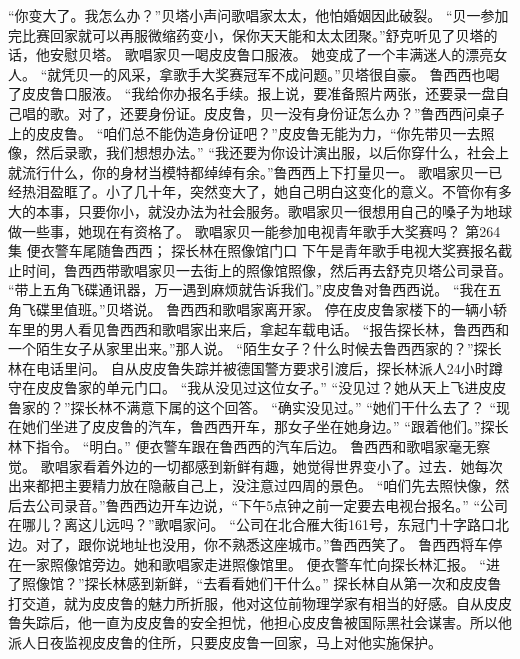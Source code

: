 \documentclass[a4paper,12pt,UTF8,twoside]{ctexbook}
\begin{document}
        “你变大了。我怎么办？”贝塔小声问歌唱家太太，他怕婚姻因此破裂。  
        “贝一参加完比赛回家就可以再服微缩药变小，保你天天能和太太团聚。”舒克听见了贝塔的话，他安慰贝塔。  
        歌唱家贝一喝皮皮鲁口服液。  
        她变成了一个丰满迷人的漂亮女人。  
        “就凭贝一的风采，拿歌手大奖赛冠军不成问题。”贝塔很自豪。  
        鲁西西也喝了皮皮鲁口服液。  
        “我给你办报名手续。报上说，要准备照片两张，还要录一盘自己唱的歌。对了，还要身份证。皮皮鲁，贝一没有身份证怎么办？”鲁西西问桌子上的皮皮鲁。  
        “咱们总不能伪造身份证吧？”皮皮鲁无能为力，“你先带贝一去照像，然后录歌，我们想想办法。”  
        “我还要为你设计演出服，以后你穿什么，社会上就流行什么，你的身材当模特都绰绰有余。”鲁西西上下打量贝一。  
        歌唱家贝一已经热泪盈眶了。小了几十年，突然变大了，她自己明白这变化的意义。不管你有多大的本事，只要你小，就没办法为社会服务。歌唱家贝一很想用自己的嗓子为地球做一些事，她现在有资格了。  
        歌唱家贝一能参加电视青年歌手大奖赛吗？        第264集  
        便衣警车尾随鲁西西；  
        探长林在照像馆门口  
        下午是青年歌手电视大奖赛报名截止时间，鲁西西带歌唱家贝一去街上的照像馆照像，然后再去舒克贝塔公司录音。  
        “带上五角飞碟通讯器，万一遇到麻烦就告诉我们。”皮皮鲁对鲁西西说。  
        “我在五角飞碟里值班。”贝塔说。  
        鲁西西和歌唱家离开家。  
        停在皮皮鲁家楼下的一辆小轿车里的男人看见鲁西西和歌唱家出来后，拿起车载电话。  
        “报告探长林，鲁西西和一个陌生女子从家里出来。”那人说。  
        “陌生女子？什么时候去鲁西西家的？”探长林在电话里问。        
        自从皮皮鲁失踪并被德国警方要求引渡后，探长林派人24小时蹲守在皮皮鲁家的单元门口。  
        “我从没见过这位女子。”  
        “没见过？她从天上飞进皮皮鲁家的？”探长林不满意下属的这个回答。  
        “确实没见过。”  
        “她们干什么去了？  
        “现在她们坐进了皮皮鲁的汽车，鲁西西开车，那女子坐在她身边。”  
        “跟着他们。”探长林下指令。  
        “明白。”  
        便衣警车跟在鲁西西的汽车后边。  
        鲁西西和歌唱家毫无察觉。  
        歌唱家看着外边的一切都感到新鲜有趣，她觉得世界变小了。过去．她每次出来都把主要精力放在隐蔽自己上，没注意过四周的景色。  
        “咱们先去照快像，然后去公司录音。”鲁西西边开车边说，“下午5点钟之前一定要去电视台报名。”  
        “公司在哪儿？离这儿远吗？”歌唱家问。  
        “公司在北合雁大街161号，东冠门十字路口北边。对了，跟你说地址也没用，你不熟悉这座城市。”鲁西西笑了。  
        鲁西西将车停在一家照像馆旁边。她和歌唱家走进照像馆里。  
        便衣警车忙向探长林汇报。  
        “进了照像馆？”探长林感到新鲜，“去看看她们干什么。”  
        探长林自从第一次和皮皮鲁打交道，就为皮皮鲁的魅力所折服，他对这位前物理学家有相当的好感。自从皮皮鲁失踪后，他一直为皮皮鲁的安全担忧，他担心皮皮鲁被国际黑社会谋害。所以他派人日夜监视皮皮鲁的住所，只要皮皮鲁一回家，马上对他实施保护。  
\end{document}
